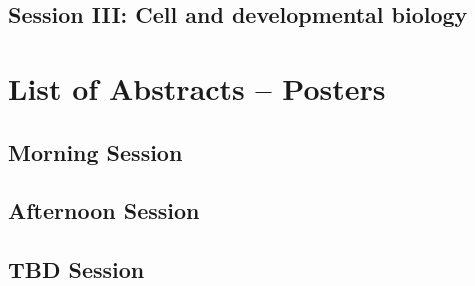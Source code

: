 \documentclass[10pt,a4paper]{scrreprt}
\newcommand{\dosabstract}[4]{
\filbreak %

\noindent
{\large \bfseries #1} %

\noindent
{\bfseries \itshape #2} %

\noindent
\textcolor{mpigrey}{#3} %

\vskip 0.2 cm
\noindent
#4 %
\vskip 0.5 cm
}
\begin{document}
\section{Session III: Cell and developmental biology}


\chapter{List of Abstracts -- Posters} 

\vspace{-2.5em}

\section{Morning Session}

\section{Afternoon Session}

\section*{TBD Session}



%
\end{document}
